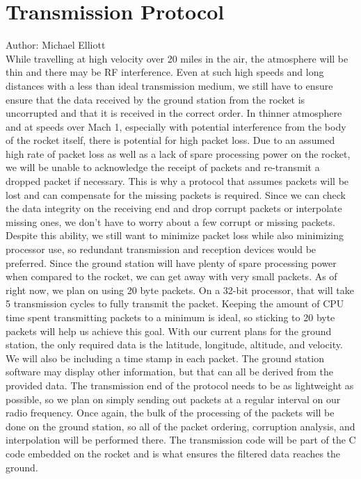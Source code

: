 \documentclass[onecolumn, draftclsnofoot,10pt, compsoc]{IEEEtran}
\begin{document}
\section {Transmission Protocol}
Author: Michael Elliott\\
While travelling at high velocity over 20 miles in the air, the
atmosphere will be thin and there may be RF interference.
Even at such high speeds and long distances with a less than ideal
transmission medium, we still have to ensure ensure that the data
received by the ground station from the rocket is uncorrupted and that
it is received in the correct order.
In thinner atmosphere and at speeds over Mach 1, especially with
potential interference from the body of the rocket itself, there is
potential for high packet loss.
Due to an assumed high rate of packet loss as well as a lack of spare
processing power on the rocket, we will be unable to acknowledge the
receipt of packets and re-transmit a dropped packet if necessary.
This is why a protocol that assumes packets will be lost and can
compensate for the missing packets is required.
Since we can check the data integrity on the receiving end and drop
corrupt packets or interpolate missing ones, we don't have to worry
about a few corrupt or missing packets.
Despite this ability, we still want to minimize packet loss while also
minimizing processor use, so redundant transmission and reception
devices would be preferred.
Since the ground station will have plenty of spare processing power
when compared to the rocket, we can get away with very small packets.
As of right now, we plan on using 20 byte packets.
On a 32-bit processor, that will take 5 transmission cycles to fully
transmit the packet.
Keeping the amount of CPU time spent transmitting packets to a minimum
is ideal, so sticking to 20 byte packets will help us achieve this
goal.
With our current plans for the ground station, the only required data
is the latitude, longitude, altitude, and velocity.
We will also be including a time stamp in each packet.
The ground station software may display other information, but that
can all be derived from the provided data.
The transmission end of the protocol needs to be as lightweight as
possible, so we plan on simply sending out packets at a regular
interval on our radio frequency.
Once again, the bulk of the processing of the packets will be done on
the ground station, so all of the packet ordering, corruption
analysis, and interpolation will be performed there.
The transmission code will be part of the C code embedded on the
rocket and is what ensures the filtered data reaches the ground.
\end{document}
